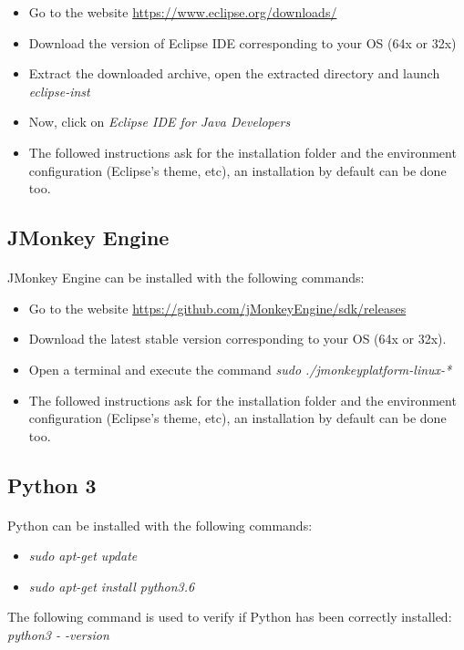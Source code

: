 \documentclass[12pt]{report}
\begin{document}
\begin{itemize}
	\item Go to the website \url{https://www.eclipse.org/downloads/}
	\item Download the version of Eclipse IDE corresponding to your OS (64x or 32x)
	\item Extract the downloaded archive, open the extracted directory and launch \emph{eclipse-inst}
	\item Now, click on \emph{Eclipse IDE for Java Developers} 
	\item The followed instructions ask for the installation folder and the environment configuration (Eclipse's theme, etc), an installation by default can be done too.
\end{itemize}

\subsection{JMonkey Engine}
\paragraph{}
JMonkey Engine can be installed with the following commands:

\begin{itemize}
	\item Go to the website \url{https://github.com/jMonkeyEngine/sdk/releases}
	\item Download the latest stable version corresponding to your OS (64x or 32x).
	\item Open a terminal and execute the command \emph{sudo ./jmonkeyplatform-linux-*}
	\item The followed instructions ask for the installation folder and the environment configuration (Eclipse's theme, etc), an installation by default can be done too.
\end{itemize}


\subsection{Python 3}
\paragraph{}
Python can be installed with the following commands:

\begin{itemize}
	\item \emph{sudo apt-get update}
	\item \emph{sudo apt-get install python3.6}
\end{itemize}
The following command is used to verify if Python has been correctly installed: \emph{python3 - -version}
\end{document}

